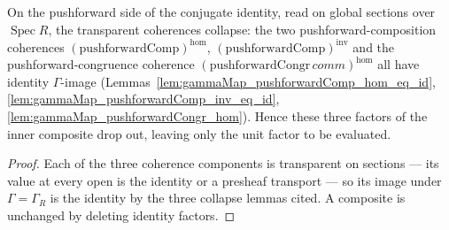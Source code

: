 \begin{lemma}

  \label{lem:base_change_mate_reindex_conj_pushforwardCollapse}
  On the pushforward side of the conjugate identity, read on global sections over
  \(\operatorname{Spec} R\), the transparent coherences collapse: the two
  pushforward-composition coherences
  \((\mathrm{pushforwardComp})^{\mathrm{hom}}\), \((\mathrm{pushforwardComp})^{\mathrm{inv}}\) and the
  pushforward-congruence coherence \((\mathrm{pushforwardCongr}\,\mathit{comm})^{\mathrm{hom}}\) all have
  identity \(\Gamma\)-image (Lemmas~\ref{lem:gammaMap_pushforwardComp_hom_eq_id},
  \ref{lem:gammaMap_pushforwardComp_inv_eq_id}, \ref{lem:gammaMap_pushforwardCongr_hom}). Hence these
  three factors of the inner composite drop out, leaving only the unit factor to be evaluated.
\end{lemma}

\begin{proof}
  Each of the three coherence components is transparent on sections — its value at every open is the
  identity or a presheaf transport — so its image under \(\Gamma = \Gamma_R\) is the identity by the
  three collapse lemmas cited. A composite is unchanged by deleting identity factors.
\end{proof}

